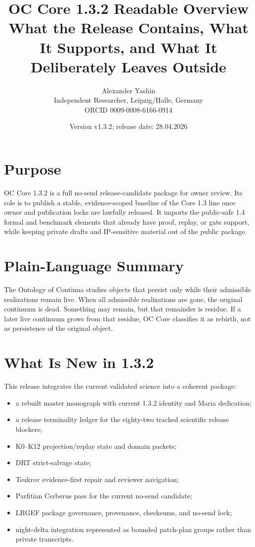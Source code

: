 \documentclass[11pt,a4paper]{article}
\title{\textbf{OC Core 1.3.2 Readable Overview}\\
\large What the Release Contains, What It Supports, and What It Deliberately Leaves Outside}
\author{Alexander Yashin\\Independent Researcher, Leipzig/Halle, Germany\\ORCID 0009-0008-6166-0914}
\date{Version v1.3.2; release date: 28.04.2026}
\begin{document}
\maketitle

\section*{Purpose}
OC Core 1.3.2 is a full no-send release-candidate package for owner review. Its role is to publish a stable, evidence-scoped baseline of the Core 1.3 line once owner and publication locks are lawfully released. It imports the public-safe 1.4 formal and benchmark elements that already have proof, replay, or gate support, while keeping private drafts and IP-sensitive material out of the public package.

\section*{Plain-Language Summary}
The Ontology of Continua studies objects that persist only while their admissible realizations remain live. When all admissible realizations are gone, the original continuum is dead. Something may remain, but that remainder is residue. If a later live continuum grows from that residue, OC Core classifies it as rebirth, not as persistence of the original object.

\section*{What Is New in 1.3.2}
This release integrates the current validated science into a coherent package:
\begin{itemize}
  \item a rebuilt master monograph with current 1.3.2 identity and Maria dedication;
  \item a release terminality ledger for the eighty-two tracked scientific release blockers;
  \item K0--K12 projection/replay state and domain packets;
  \item DRT strict-salvage state;
  \item Tsukrov evidence-first repair and reviewer navigation;
  \item Parfitian Cerberus pass for the current no-send candidate;
  \item LRGEF package governance, provenance, checksums, and no-send lock;
  \item night-delta integration represented as bounded patch-plan groups rather than private transcripts.
\end{itemize}
\end{document}
